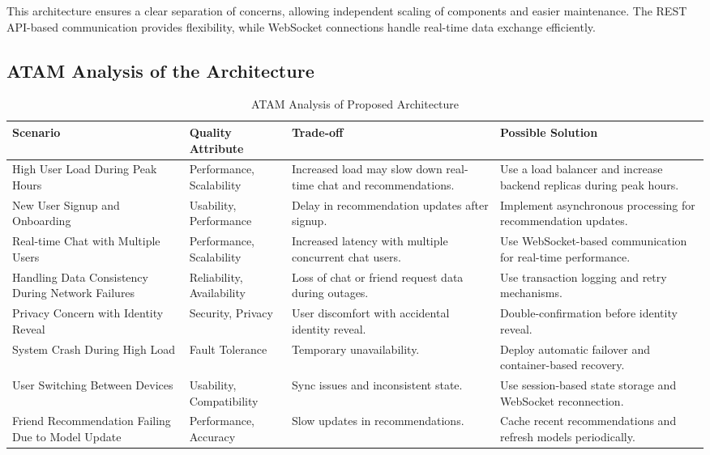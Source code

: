 \documentclass[12pt,a4paper]{article}
\begin{document}
This architecture ensures a clear separation of concerns, allowing independent scaling of components and easier maintenance. The REST API-based communication provides flexibility, while WebSocket connections handle real-time data exchange efficiently.

\subsection{ATAM Analysis of the Architecture}
\begin{table}[H]
    \centering
    \renewcommand{\arraystretch}{1.25}
    \begin{tabular}{|p{3.5cm}|p{2.5cm}|p{4cm}|p{4cm}|}
        \hline
        \textbf{Scenario} & \textbf{Quality Attribute} & \textbf{Trade-off} & \textbf{Possible Solution} \\
        \hline
        High User Load During Peak Hours & Performance, Scalability & Increased load may slow down real-time chat and recommendations. & Use a load balancer and increase backend replicas during peak hours. \\
        \hline
        New User Signup and Onboarding & Usability, Performance & Delay in recommendation updates after signup. & Implement asynchronous processing for recommendation updates. \\
        \hline
        Real-time Chat with Multiple Users & Performance, Scalability & Increased latency with multiple concurrent chat users. & Use WebSocket-based communication for real-time performance. \\
        \hline
        Handling Data Consistency During Network Failures & Reliability, Availability & Loss of chat or friend request data during outages. & Use transaction logging and retry mechanisms. \\
        \hline
        Privacy Concern with Identity Reveal & Security, Privacy & User discomfort with accidental identity reveal. & Double-confirmation before identity reveal. \\
        \hline
        System Crash During High Load & Fault Tolerance & Temporary unavailability. & Deploy automatic failover and container-based recovery. \\
        \hline
        User Switching Between Devices & Usability, Compatibility & Sync issues and inconsistent state. & Use session-based state storage and WebSocket reconnection. \\
        \hline
        Friend Recommendation Failing Due to Model Update & Performance, Accuracy & Slow updates in recommendations. & Cache recent recommendations and refresh models periodically. \\
        \hline
    \end{tabular}
    \caption{ATAM Analysis of Proposed Architecture}
\end{table}
\end{document}
